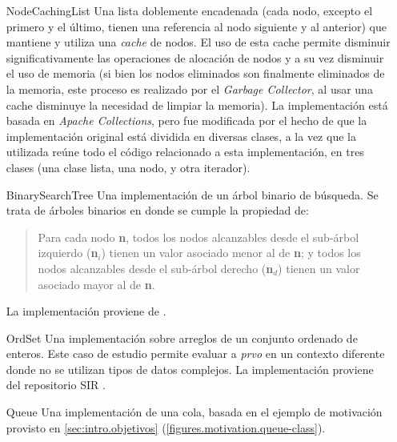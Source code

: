 \begin{enumerate}[leftmargin=.75cm,align=left,style=nextline]
	\item[NodeCachingList] Una lista doblemente encadenada (cada nodo, excepto el primero y el \'ultimo, tienen una referencia al nodo siguiente y al anterior) que mantiene y utiliza una \emph{cache} de nodos. El uso de esta cache permite disminuir significativamente las operaciones de alocaci\'on de nodos y a su vez disminuir el uso de memoria (si bien los nodos eliminados son finalmente eliminados de la memoria, este proceso es realizado por el \emph{Garbage Collector}, al usar una cache disminuye la necesidad de limpiar la memoria). La implementaci\'on est\'a basada en \emph{Apache Collections}, pero fue modificada por el hecho de que la implementaci\'on original est\'a dividida en diversas clases, a la vez que la utilizada re\'une todo el c\'odigo relacionado a esta implementaci\'on, en tres clases (una clase lista, una nodo, y otra iterador).
	
	\item[BinarySearchTree] Una implementaci\'on de un \'arbol binario de b\'usqueda. Se trata de \'arboles binarios en donde se cumple la propiedad de:
	\begin{quote}
		Para cada nodo \textbf{n}, todos los nodos alcanzables desde el sub-\'arbol izquierdo (\textbf{n$_i$}) tienen un valor asociado menor al de \textbf{n}; y todos los nodos alcanzables desde el sub-\'arbol derecho (\textbf{n$_d$}) tienen un valor asociado mayor al de \textbf{n}.
	\end{quote}
	La implementaci\'on proviene de \cite{bibliography.mutation.tools.TACOGaleottiRPF13}.
	
	\item[OrdSet] Una implementaci\'on sobre arreglos de un conjunto ordenado de enteros. Este caso de estudio permite evaluar a \emph{prvo} en un contexto diferente donde no se utilizan tipos de datos complejos. La implementaci\'on proviene del repositorio SIR \cite{bibliography.testing.SIRDoER05}.
	
	\item[Queue] Una implementaci\'on de una cola, basada en el ejemplo de motivaci\'on provisto en \ref{sec:intro.objetivos} (\ref{figures.motivation.queue-class}).
	
	
\end{enumerate}

